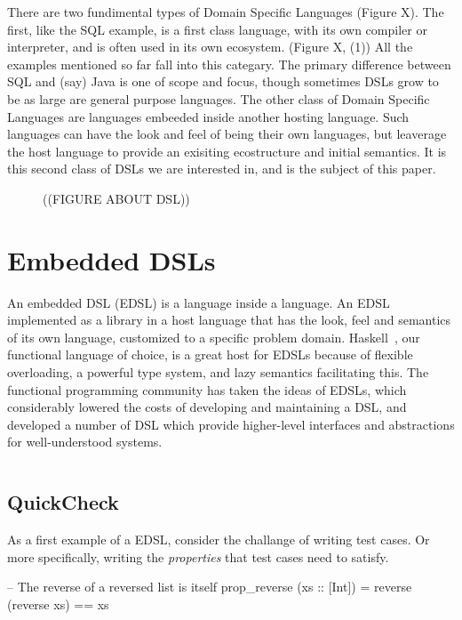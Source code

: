 \documentclass[11pt]{article}
\newcommand{\cursor}{%
\begin{center}
\marginpar{\vskip 4pt\sc Cursor}
\begin{tabular*}{\linewidth}{c}
\hline
\end{tabular*}
\end{center}
}
\begin{document}
There are two fundimental types of Domain Specific Languages
(Figure X).
%
The first, like the SQL example, is a first class language,
with its own compiler or interpreter, and is often used in
its own ecosystem. (Figure X, (1)) 
All the examples mentioned so far fall
into this categary. The primary difference between SQL and
(say) Java is one of scope and focus, though sometimes
DSLs grow to be as large are general purpose languages.
%
The other class of Domain Specific Languages are languages
embeeded inside another hosting language. Such languages
can have the look and feel of being their own languages,
but leaverage the host language to provide an exisiting
ecostructure and initial semantics. It is this second
class of DSLs we are interested in, and is the subject of
this paper.

\begin{figure}
((FIGURE ABOUT DSL))

\end{figure}

\section{Embedded DSLs}

An embedded DSL (EDSL) is a language inside a language.
An EDSL implemented as a library in a host language
that has the look, feel and semantics of its own language,
customized to a specific problem domain.
Haskell~\cite{Haskell98Book}, our functional language of choice, is a great host for EDSLs
because of flexible overloading, a powerful type system, and lazy semantics facilitating this.
The functional programming community has taken  the ideas
of EDSLs, which considerably lowered the costs of developing
and maintaining a DSL, and developed a number of DSL 
which provide higher-level interfaces and abstractions for well-understood systems.

\cursor{}

\subsection{QuickCheck}

As a first example of a EDSL, consider the challange of writing test cases.
Or more specifically, writing the {\em properties\/} that test cases need to satisfy.

\begin{Code}
-- The reverse of a reversed list is itself
prop_reverse (xs :: [Int]) = reverse (reverse xs) == xs
\end{Code}
\end{document}
